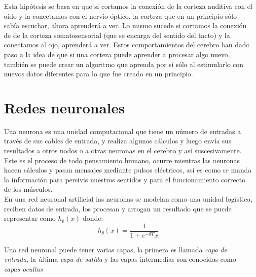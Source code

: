 \documentclass{report}
\begin{document}
Esta hipótesis se basa en que si cortamos la conexión de la corteza auditiva con el oído y la conectamos con el nervio óptico, la corteza que en un principio sólo sabía escuchar, ahora aprenderá a ver. Lo mismo sucede si cortamos la conexión de de la corteza somatosensorial (que se encarga del sentido del tacto) y la conectamos al ojo, aprenderá a ver. Estos comportamientos del cerebro han dado paso a la idea de que si una corteza puede aprender a procesar algo nuevo, también se puede crear un algoritmo que aprenda por sí sólo al estimularlo con nuevos datos diferentes para lo que fue creado en un principio.
\section{Redes neuronales}
	Una neurona es una unidad computacional que tiene un número de entradas a través de sus cables de entrada, y realiza algunos cálculos y luego envía sus resultados a otros nodos o a otras neuronas en el cerebro y así suscesivamente. Este es el proceso de todo pensamiento humano, ocurre mientras las neuronas hacen cálculos y pasan mensajes mediante pulsos eléctricos, así es como se manda la información para persivis nuestros sentidos y para el funcionamiento correcto de los músculos.\\

	En una red neuronal artificial las neuronas se modelan como una unidad logística, reciben datos de entrada, los procesan y arrogan un resultado que se puede representar como $ h_\theta(x) $ donde:
		\[
			h_\theta(x)=\frac{1}{1+e^{-\theta T}x}
		\]

	Una red neuronal puede tener varias capas, la primera es llamada \textit{capa de entrada}, la última \textit{capa de salida} y las capas intermedias son conocidas como \textit{capas ocultas}
\subsection{}
\end{document}
